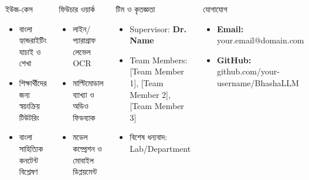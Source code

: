 \documentclass[final]{beamer}
\begin{document}
\begin{frame}[t]
\begin{columns}[t]
\begin{block}{ইউজ-কেস}
\vspace{0.2cm}
\begin{itemize}
  \item বাংলা হ্যান্ডরাইটিং যাচাই ও শেখা
  \item শিক্ষার্থীদের জন্য স্বয়ংক্রিয় টিউটরিং
  \item বাংলা সাহিত্যিক কনটেন্ট বিশ্লেষণ
\end{itemize}
\end{block}

\begin{block}{ফিউচার ওয়ার্ক}
\vspace{0.2cm}
\begin{itemize}
  \item লাইন/প্যারাগ্রাফ লেভেল OCR
  \item মাল্টিমোডাল ব্যাখ্যা ও অডিও ফিডব্যাক
  \item মডেল কম্প্রেশন ও মোবাইল ডিপ্লয়মেন্ট
\end{itemize}
\end{block}

\begin{block}{টিম ও কৃতজ্ঞতা}
\vspace{0.2cm}
\begin{itemize}
  \item Supervisor: \textbf{Dr. Name}
  \item Team Members: [Team Member 1], [Team Member 2], [Team Member 3]
  \item বিশেষ ধন্যবাদ: Lab/Department
\end{itemize}
\end{block}

\begin{block}{যোগাযোগ}
\vspace{0.2cm}
\begin{itemize}
  \item \textbf{Email:} your.email@domain.com
  \item \textbf{GitHub:} github.com/your-username/BhashaLLM
\end{itemize}
\vspace{0.2cm}
\end{block}

\end{columns}
\end{frame}
\end{document}
